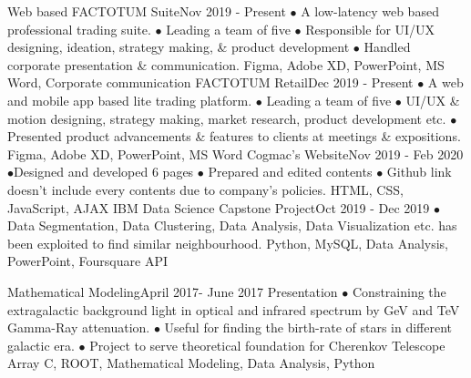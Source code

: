 %
%
%

\begin{projects}
  \project
    {Web based FACTOTUM Suite}{Nov 2019 - Present}
    {}
    {$\bullet$ A low-latency web based professional trading suite. $\bullet$ Leading a team of five $\bullet$ Responsible for UI/UX designing, ideation, strategy making, \& product development $\bullet$ Handled corporate presentation \& communication.}
    {Figma, Adobe XD, PowerPoint, MS Word, Corporate communication}
  \project
    {FACTOTUM Retail}{Dec 2019 - Present}
    { }
    {$\bullet$ A web and mobile app based lite trading platform. $\bullet$ Leading a team of five $\bullet$ UI/UX \& motion designing, strategy making, market research, product development etc. $\bullet$ Presented product advancements \& features to clients at meetings \& expositions.}
    {Figma, Adobe XD, PowerPoint, MS Word}
   \project   
    {Cogmac's Website}{Nov 2019 - Feb 2020}
    { }
    {$\bullet$Designed and developed 6 pages $\bullet$ Prepared and edited contents $\bullet$ Github link doesn't include every contents due to company's policies.}
    {HTML, CSS, JavaScript, AJAX}
    \project
    {IBM Data Science Capstone Project}{Oct 2019 - Dec 2019}
    {  }
    {$\bullet$ Data Segmentation, Data Clustering, Data Analysis, Data Visualization etc. has been exploited to find similar neighbourhood.}
    {Python, MySQL, Data Analysis, PowerPoint, Foursquare API}
    
   \project
    {Mathematical Modeling}{April 2017- June 2017}
    {  {Presentation}}
    {$\bullet$ Constraining the extragalactic background light in optical and infrared spectrum by GeV and TeV Gamma-Ray attenuation. $\bullet$ Useful for finding the birth-rate of stars in different galactic era. $\bullet$ Project to serve theoretical foundation for Cherenkov Telescope Array}
    {C, ROOT, Mathematical Modeling, Data Analysis, Python}
    

\end{projects}
